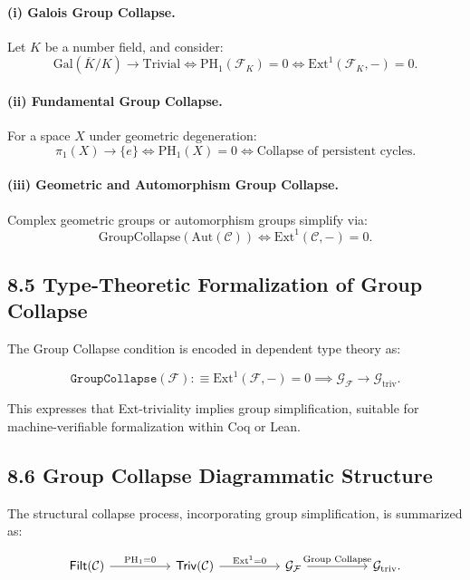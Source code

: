 \documentclass[11pt]{article}
\begin{document}
\paragraph{(i) Galois Group Collapse.}
Let \( K \) be a number field, and consider:
\[
\mathrm{Gal}(\overline{K}/K) \longrightarrow \mathrm{Trivial} \iff \mathrm{PH}_1(\mathcal{F}_K) = 0 \iff \mathrm{Ext}^1(\mathcal{F}_K, -) = 0.
\]

\paragraph{(ii) Fundamental Group Collapse.}
For a space \( X \) under geometric degeneration:
\[
\pi_1(X) \longrightarrow \{e\} \iff \mathrm{PH}_1(X) = 0 \iff \text{Collapse of persistent cycles}.
\]

\paragraph{(iii) Geometric and Automorphism Group Collapse.}
Complex geometric groups or automorphism groups simplify via:
\[
\mathrm{GroupCollapse}(\mathrm{Aut}(\mathcal{C})) \iff \mathrm{Ext}^1(\mathcal{C}, -) = 0.
\]

\subsection*{8.5 Type-Theoretic Formalization of Group Collapse}

The Group Collapse condition is encoded in dependent type theory as:

\[
\texttt{GroupCollapse}(\mathcal{F}) :\equiv \mathrm{Ext}^1(\mathcal{F}, -) = 0 \implies \mathcal{G}_{\mathcal{F}} \longrightarrow \mathcal{G}_{\mathrm{triv}}.
\]

This expresses that Ext-triviality implies group simplification, suitable for machine-verifiable formalization within Coq or Lean.

\subsection*{8.6 Group Collapse Diagrammatic Structure}

The structural collapse process, incorporating group simplification, is summarized as:

\[
\begin{tikzcd}[column sep=huge]
\mathsf{Filt}(\mathcal{C}) \arrow[r, "\mathrm{PH}_1 = 0"]
& \mathsf{Triv}(\mathcal{C}) \arrow[r, "\mathrm{Ext}^1 = 0"]
& \mathcal{G}_{\mathcal{F}} \arrow[r, "\text{Group Collapse}"]
& \mathcal{G}_{\mathrm{triv}}.
\end{tikzcd}
\]
\end{document}
